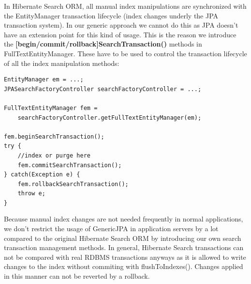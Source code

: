 In Hibernate Search ORM, all manual index manipulations are synchronized with the EntityManager transaction lifecycle (index changes underly the JPA transaction system). In our generic approach we cannot do this as JPA doesn't have an extension point for this kind of usage. This is the reason we introduce the \textbf{[begin/commit/rollback]SearchTransaction()} methods in FullTextEntityManager. These have to be used to control the transaction lifecycle of all the index manipulation methods:
\\
\lstset{language=java}
\begin{lstlisting}[frame=htrbl, caption={Index control with Hibernate Search GenericJPA}, label={lst:index_control_hibernatesearchgenericjpa}]
EntityManager em = ...;
JPASearchFactoryController searchFactoryController = ...;

FullTextEntityManager fem = 
	searchFactoryController.getFullTextEntityManager(em);

fem.beginSearchTransaction();
try {
	//index or purge here
	fem.commitSearchTransaction();
} catch(Exception e) {
	fem.rollbackSearchTransaction();
	throw e;
}
\end{lstlisting}
\noindent
Because manual index changes are not needed frequently in normal applications, we don't restrict the usage of GenericJPA in application servers by a lot compared to the original Hibernate Search ORM by introducing our own search transaction management methods. In general, Hibernate Search transactions can not be compared with real RDBMS transactions anyways as it is allowed to write changes to the index without commiting with flushToIndexes(). Changes applied in this manner can not be reverted by a rollback.

